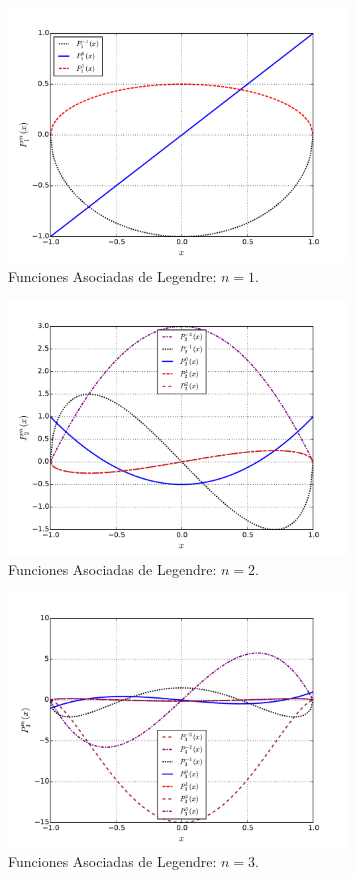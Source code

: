 \begin{figure}[H]
\centering
\includegraphics[angle=0,width=0.8\textwidth]{figs/fig-Legendre-Asoc-l-1.pdf}
\caption{Funciones Asociadas de Legendre: $n=1$.}
\label{fig-P1m}
\end{figure}
\begin{figure}[H]
\centering
\includegraphics[angle=0,width=0.8\textwidth]{figs/fig-Legendre-Asoc-l-2.pdf}
\caption{Funciones Asociadas de Legendre: $n=2$.}
\label{fig-P2m}
\end{figure}
\begin{figure}[H]
\centering
\includegraphics[angle=0,width=0.8\textwidth]{figs/fig-Legendre-Asoc-l-3.pdf}
\caption{Funciones Asociadas de Legendre: $n=3$.}
\label{fig-P3m}
\end{figure}
